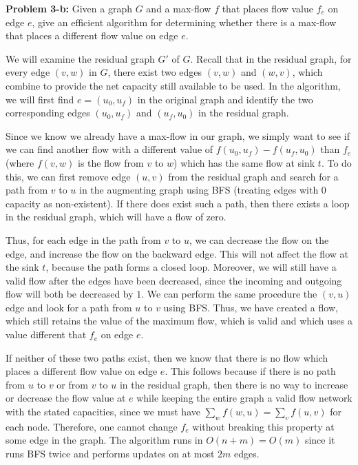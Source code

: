 \documentclass[psamsfonts]{amsart}
\newenvironment{sol}{\vspace{0.25cm}{\large \bfseries Solution:}}{\qedsymbol}
\newenvironment{prob}[1]{\begin{framed}{\large \bfseries Problem #1:}}{\end{framed}}
\begin{document}
\begin{prob}{3-b}
Given a graph $G$ and a max-flow $f$ that places flow value $f_e$ on edge $e$, give an efficient algorithm for determining whether there is a max-flow that places a different flow value on edge $e$.
\end{prob}
\begin{sol}
We will examine the residual graph $G'$ of $G$. Recall that in the residual graph, for every edge $(v,w)$ in $G$, there exist two edges $(v,w)$ and $(w,v)$, which combine to provide the net capacity still available to be used. In the algorithm, we will first find $e = (u_0, u_f)$ in the original graph and identify the two corresponding edges $(u_0, u_f)$ and $(u_f, u_0)$ in the residual graph.

Since we know we already have a max-flow in our graph, we simply want to see if we can find another flow with a different value of $f(u_0,u_f) - f(u_f, u_0)$ than $f_e$ (where $f(v,w)$ is the flow from $v$ to $w$) which has the same flow at sink $t$. To do this, we can first remove edge $(u,v)$ from the residual graph and search for a path from $v$ to $u$ in the augmenting graph using BFS (treating edges with 0 capacity as non-existent). If there does exist such a path, then there exists a loop in the residual graph, which will have a flow of zero. 

Thus, for each edge in the path from $v$ to $u$, we can decrease the flow on the edge, and increase the flow on the backward edge. This will not affect the flow at the sink $t$, because the path forms a closed loop. Moreover, we will still have a valid flow after the edges have been decreased, since the incoming and outgoing flow will both be decreased by $1$. We can perform the same procedure the $(v,u)$ edge and look for a path from $u$ to $v$ using BFS. Thus, we have created a flow, which still retains the value of the maximum flow, which is valid and which uses a value different that $f_e$ on edge $e$. 

If neither of these two paths exist, then we know that there is no flow which places a different flow value on edge $e$. This follows because if there is no path from $u$ to $v$ or from $v$ to $u$ in the residual graph, then there is no way to increase or decrease the flow value at $e$ while keeping the entire graph a valid flow network with the stated capacities, since we must have $\sum_w f(w,u) = \sum_v f(u,v)$ for each node. Therefore, one cannot change $f_e$ without breaking this property at some edge in the graph. The algorithm runs in $O(n+m) = O(m)$ since it runs BFS twice and performs updates on at most $2m$ edges.
\end{sol}
\end{document}
